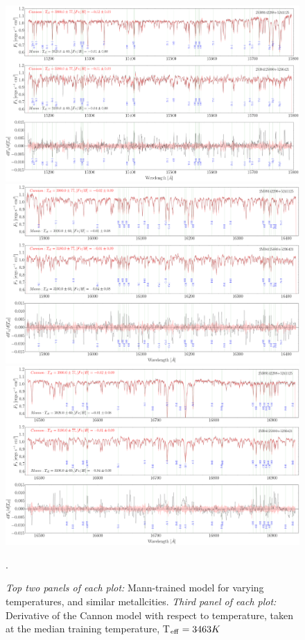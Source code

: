 \documentclass[preprint]{aastex62}
\begin{document}
\begin{figure}[ht]
\begin{center}
\includegraphics[width=16cm]{figures/demo_derivatives_teff1.png}
\includegraphics[width=16cm]{figures/demo_derivatives_teff2.png}
\includegraphics[width=16cm]{figures/demo_derivatives_teff3.png}
\end{center}
\caption{\textit{Top two panels of each plot:} Mann-trained model for varying temperatures, and similar metallcities. \textit{Third panel of each plot:} Derivative of the Cannon model with respect to temperature, taken at the median training temperature, T$_{\rm eff}=3463 K$}. \label{fig:demo_teff}
\end{figure}
\end{document}
